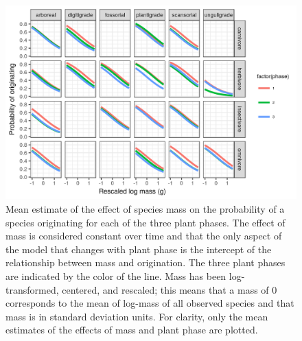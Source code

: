 \documentclass[12pt,letterpaper]{article}
\begin{document}
\begin{figure}[ht]
  \centering
  \includegraphics[width=\textwidth,height=0.4\textheight,keepaspectratio=true]{figure/mass_on_origin_bd}
  \caption[Effect of mass on probability of species origination as estimated from the birth-death model]{Mean estimate of the effect of species mass on the probability of a species originating for each of the three plant phases. The effect of mass is considered constant over time and that the only aspect of the model that changes with plant phase is the intercept of the relationship between mass and origination. The three plant phases are indicated by the color of the line. Mass has been log-transformed, centered, and rescaled; this means that a mass of 0 corresponds to the mean of log-mass of all observed species and that mass is in standard deviation units. For clarity, only the mean estimates of the effects of mass and plant phase are plotted.}
  \label{fig:mass_origin}
\end{figure}
\end{document}
